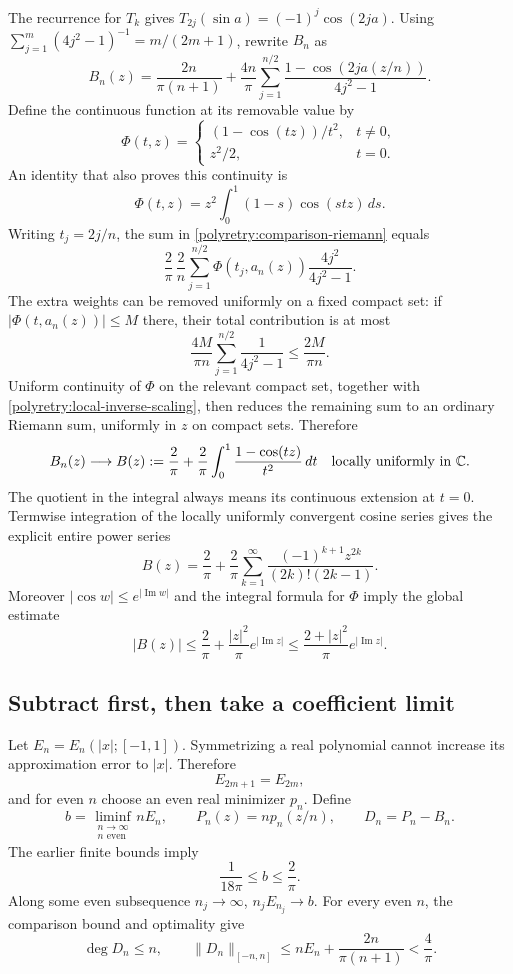 \documentclass[11pt]{article}
\newcommand{\C}{\mathbb C}
\theoremstyle{remark}
\numberwithin{equation}{section}
\begin{document}
The recurrence for $T_k$ gives
$T_{2j}(\sin a)=(-1)^j\cos(2ja)$.
Using $\sum_{j=1}^{m}(4j^2-1)^{-1}=m/(2m+1)$, rewrite $B_n$ as
\begin{equation}\label{polyretry:comparison-riemann}
 B_n(z)=\frac{2n}{\pi(n+1)}+
 \frac{4n}{\pi}\sum_{j=1}^{n/2}
 \frac{1-\cos(2j a(z/n))}{4j^2-1}.
\end{equation}
Define the continuous function at its removable value by
\[
 \Phi(t,z)=
 \begin{cases}(1-\cos(tz))/t^2,&t\ne0,\\z^2/2,&t=0.\end{cases}
\]
An identity that also proves this continuity is
\[
 \Phi(t,z)=z^2\int_0^1(1-s)\cos(stz)\,ds.
\]
Writing $t_j=2j/n$, the sum in
\eqref{polyretry:comparison-riemann} equals
\[
 \frac2\pi\,\frac2n\sum_{j=1}^{n/2}
 \Phi(t_j,a_n(z))\frac{4j^2}{4j^2-1}.
\]
The extra weights can be removed uniformly on a fixed compact set:
if $|\Phi(t,a_n(z))|\le M$ there, their total contribution is at most
\[
 \frac{4M}{\pi n}\sum_{j=1}^{n/2}\frac1{4j^2-1}
 \le\frac{2M}{\pi n}.
\]
Uniform continuity of $\Phi$ on the relevant compact set, together with
\eqref{polyretry:local-inverse-scaling}, then reduces the remaining sum
to an ordinary Riemann sum, uniformly in $z$ on compact sets.
Therefore
\begin{equation}\label{polyretry:comparison-entire}
 B_n(z)\longrightarrow
 B(z):=\frac2\pi+\frac2\pi\int_0^1\frac{1-\cos(tz)}{t^2}\,dt
 \quad\hbox{locally uniformly in $\C$}.
\end{equation}
The quotient in the integral always means its continuous extension at
$t=0$.  Termwise integration of the locally uniformly convergent cosine
series gives the explicit entire power series
\[
 B(z)=\frac2\pi+
 \frac2\pi\sum_{k=1}^{\infty}
 \frac{(-1)^{k+1}z^{2k}}{(2k)!(2k-1)}.
\]
Moreover $|\cos w|\le e^{|\operatorname{Im}w|}$ and the integral formula
for $\Phi$ imply the global estimate
\begin{equation}\label{polyretry:comparison-growth}
 |B(z)|\le\frac2\pi+
 \frac{|z|^2}{\pi}e^{|\operatorname{Im}z|}
 \le\frac{2+|z|^2}{\pi}e^{|\operatorname{Im}z|}.
\end{equation}

\subsection{Subtract first, then take a coefficient limit}
\label{polyretry:scaled-extremal}

Let $E_n=E_n(|x|;[-1,1])$.  Symmetrizing a real polynomial cannot
increase its approximation error to $|x|$.  Therefore
\[
 E_{2m+1}=E_{2m},
\]
and for even $n$ choose an even real minimizer $p_n$.  Define
\[
 b=\liminf_{\substack{n\to\infty\\n\text{ even}}}nE_n,
 \qquad P_n(z)=n p_n(z/n),\qquad D_n=P_n-B_n.
\]
The earlier finite bounds imply
\[
 \frac1{18\pi}\le b\le\frac2\pi.
\]
Along some even subsequence $n_j\to\infty$, $n_jE_{n_j}\to b$.
For every even $n$, the comparison bound and optimality give
\begin{equation}\label{polyretry:difference-interval}
 \deg D_n\le n,\qquad
 \|D_n\|_{[-n,n]}
 \le nE_n+\frac{2n}{\pi(n+1)}<\frac4\pi.
\end{equation}
\end{document}
